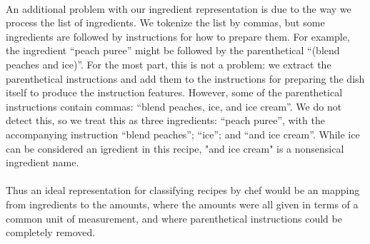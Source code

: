 \documentclass[paper=a4, fontsize=11pt]{scrartcl} %
\begin{document}
\paragraph{}
An additional problem with our ingredient representation is due to the way we process the list of ingredients. 
We tokenize the list by commas, but some ingredients are followed by instructions for how to
prepare them.  
For example, the ingredient ``peach puree'' might be followed by the parenthetical ``(blend peaches and ice)''. 
For the most part, this is not a problem: we extract the parenthetical instructions and add them to the instructions for preparing the dish itself to produce the instruction features. 
However, some of the parenthetical instructions contain commas: ``blend peaches, ice, and ice cream''. 
We do not detect this, so we treat this as three ingredients: ``peach puree'', with the accompanying instruction ``blend peaches''; ``ice''; and ``and ice cream''.  While ice can be considered an igredient in this recipe, "and ice cream" is a nonsensical ingredient name. 

\paragraph{}
Thus an ideal representation for classifying recipes by chef would be an mapping from ingredients to the amounts, where the amounts were all given in terms of a common unit of measurement, and where parenthetical instructions could be completely removed.  
\end{document}
